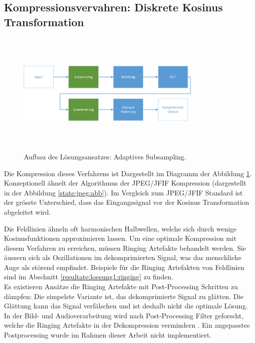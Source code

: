 \subsection{Kompressionsvervahren: Diskrete Kosinus Transformation}\label{konzept:loesung1}
\begin{figure}[!htbp]
	\center
	\includegraphics[width=0.8\textwidth,height=6cm,keepaspectratio]{./pictures/konzept/solution1/aufbau.png}
	\caption{Aufbau des Lösungsansatzes: Adaptives Subsampling.}
	\label{konzept:loesung1:aufbau}
\end{figure} 
Die Kompression dieses Verfahrens ist Dargestellt im Diagramm der Abbildung \ref{konzept:loesung1:aufbau}. Konzeptionell ähnelt der Algorithmus der JPEG/JFIF Kompression (dargestellt in der Abbildung \ref{state:jpeg:abb}). Im Vergleich zum JPEG/JFIF Standard ist der grösste Unterschied, dass das Eingangssignal vor der Kosinus Transformation abgeleitet wird.

Die Feldlinien ähneln oft harmonischen Halbwellen, welche sich durch wenige Kosinusfunktionen approximieren lassen. Um eine optimale Kompression mit diesem Verfahren zu erreichen, müssen Ringing Artefakte \cite{wiki:ringing:artefacts} behandelt werden. Sie äussern sich als Oszillationen im dekomprimierten Signal, was das menschliche Auge als störend empfindet. Beispiele für die Ringing Artefakten von Feldlinien sind im Abschnitt \ref{resultate:loesung1:ringing} zu finden.\\
Es existieren Ansätze die Ringing Artefakte mit Post-Processing Schritten zu dämpfen: Die simpelste Variante ist, das dekomprimierte Signal zu glätten. Die Glättung kann das Signal verfälschen und ist deshalb nicht die optimale Lösung. In der Bild- und Audioverarbeitung wird nach Post-Processing Filter geforscht, welche die Ringing Artefakte in der Dekompression vermindern \cite{kaup1998reduction} \cite{park1999postprocessing}. Ein angepasstes Postprocessing wurde im Rahmen dieser Arbeit nicht implementiert.

